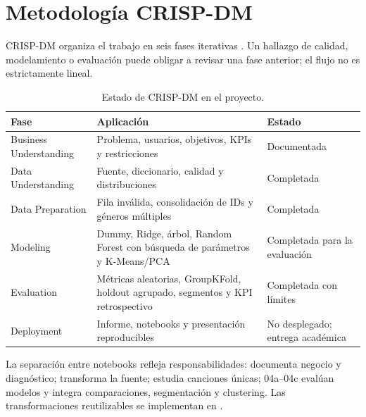 \section{Metodología CRISP-DM}

CRISP-DM organiza el trabajo en seis fases iterativas \citep{crispdm}. Un hallazgo de calidad,
modelamiento o evaluación puede obligar a revisar una fase anterior; el flujo no es estrictamente
lineal.

\begin{table}[H]
\centering
\caption{Estado de CRISP-DM en el proyecto.}
\label{tab:crispdm}
\begin{tabularx}{\textwidth}{p{3.2cm}X p{3cm}}
\toprule
Fase & Aplicación & Estado \\
\midrule
Business Understanding & Problema, usuarios, objetivos, KPIs y restricciones & Documentada \\
Data Understanding & Fuente, diccionario, calidad y distribuciones & Completada \\
Data Preparation & Fila inválida, consolidación de IDs y géneros múltiples & Completada \\
Modeling & Dummy, Ridge, árbol, Random Forest con búsqueda de parámetros y K-Means/PCA & Completada para la evaluación \\
Evaluation & Métricas aleatorias, GroupKFold, holdout agrupado, segmentos y KPI retrospectivo & Completada con límites \\
Deployment & Informe, notebooks y presentación reproducibles & No desplegado; entrega académica \\
\bottomrule
\end{tabularx}
\end{table}

La separación entre notebooks refleja responsabilidades: 
documenta negocio y diagnóstico;  transforma la fuente;
 estudia canciones únicas; 04a–04c evalúan modelos y
 integra comparaciones, segmentación y clustering. Las
transformaciones reutilizables se implementan en .
